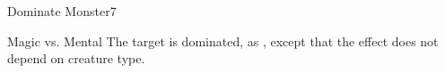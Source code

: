 \begin{spellsection}{Dominate Monster}{7}
    \begin{spellheader}
    \end{spellheader}
    \begin{spellcontent}
        \begin{spelltargetinginfo}
        \end{spelltargetinginfo}
        \begin{spelleffects}
            \begin{spellattack}{Magic vs. Mental}
                \spellsuccess The target is dominated, as , except that the effect does not depend on creature type.
            \end{spellattack}
        \end{spelleffects}
    \end{spellcontent}
    \begin{spellfooter}
        \miscastrandom
    \end{spellfooter}
\end{spellsection}

